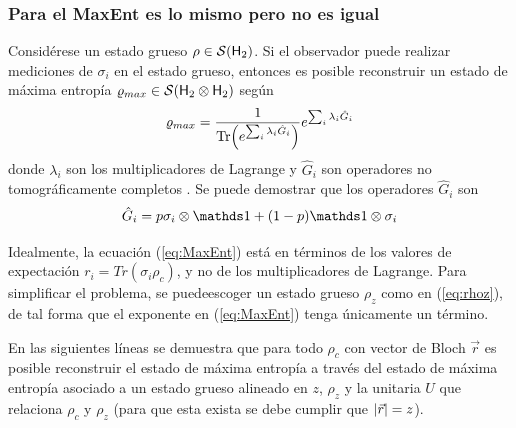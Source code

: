 \subsubsection{Para el MaxEnt es lo mismo pero no es igual}
Considérese un estado grueso $\rho\in\mathcal{S}({\sf H}_2)$. Si el observador puede realizar mediciones de $\sigma_{i}$ en el estado grueso, entonces es posible reconstruir un estado de máxima entropía $\varrho_{max}\in\mathcal{S}({\sf H}_2 \otimes {\sf H}_2)$ según
\begin{equation}\label{eq:MaxEnt}
\varrho_{max}=\frac{1}{\Tr(e^{\sum_{i}\lambda_{i}\hat{G}_{i}})}e^{\sum_{i}\lambda_{i}\hat{G}_{i}}
\end{equation}
donde $\lambda_{i}$ son los multiplicadores de Lagrange y $\hat{G}_{i}$ son operadores no tomográficamente completos \cite{MaxEnt}. Se puede demostrar que los operadores $\hat{G}_{i}$ son
\begin{equation}\label{eq:Gop}
\hat{G}_{i}=p\sigma_{i}\otimes\Id+(1-p)\Id\otimes\sigma_{i}
\end{equation}

Idealmente, la ecuación (\ref{eq:MaxEnt}) está en términos de los valores de expectación $r_{i}=Tr(\sigma_{i}\rho_{c})$, y no de los multiplicadores de Lagrange. Para simplificar el problema, se puedeescoger un estado grueso $\rho_{z}$ como en (\ref{eq:rhoz}), de tal forma que el exponente en (\ref{eq:MaxEnt}) tenga únicamente un término.

\vspace{0.2cm}

En las siguientes líneas se demuestra que para todo $\rho_{c}$ con vector de Bloch $\vec{r}$ es posible reconstruir el estado de máxima entropía a través del estado de máxima entropía asociado a un estado grueso alineado en $z$, $\rho_{z}$ y la unitaria $U$ que relaciona $\rho_{c}$ y $\rho_{z}$ (para que esta exista se debe cumplir que $\abs{\vec{r}}=z$).

\vspace{0.2cm}

